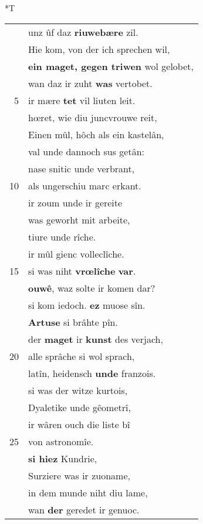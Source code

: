\documentclass[8pt,a4paper,notitlepage]{article}
\begin{document}
\begin{table}[ht]
\begin{minipage}[t]{0.5\linewidth}
\end{minipage}
\hspace{0.5cm}
\begin{minipage}[t]{0.5\linewidth}
\small
\begin{center}*T
\end{center}
\begin{tabular}{rl}
 & unz ûf daz \textbf{riuwebære} zil.\\ 
 & Hie kom, von der ich sprechen wil,\\ 
 & \textbf{ein maget, gegen triwen} wol gelobet,\\ 
 & wan daz ir zuht \textbf{was} vertobet.\\ 
5 & ir mære \textbf{tet} vil liuten leit.\\ 
 & hœret, wie diu juncvrouwe reit,\\ 
 & Einen mûl, hôch als ein kastelân,\\ 
 & val unde dannoch sus getân:\\ 
 & nase snitic unde verbrant,\\ 
10 & als ungerschiu marc erkant.\\ 
 & ir zoum unde ir gereite\\ 
 & was geworht mit arbeite,\\ 
 & tiure unde rîche.\\ 
 & ir mûl gienc volleclîche.\\ 
15 & si was niht \textbf{vrœlîche} \textbf{var}.\\ 
 & \textbf{ouwê}, waz solte ir komen dar?\\ 
 & si kom iedoch. \textbf{ez} muose sîn.\\ 
 & \textbf{Artuse} si brâhte pîn.\\ 
 & der \textbf{maget} ir \textbf{kunst} des verjach,\\ 
20 & alle sprâche si wol sprach,\\ 
 & latîn, heidensch \textbf{unde} franzois.\\ 
 & si was der witze kurtois,\\ 
 & Dyaletike unde gêometrî,\\ 
 & ir wâren ouch die liste bî\\ 
25 & von astronomîe.\\ 
 & \textbf{si hiez} Kundrie,\\ 
 & Surziere was ir zuoname,\\ 
 & in dem munde niht diu lame,\\ 
 & wan \textbf{der} geredet ir genuoc.\\ 

\end{tabular}
\end{minipage}
\end{table}
\end{document}
